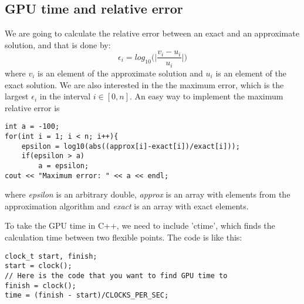 \documentclass{scrartcl}
\begin{document}
\subsection{GPU time and relative error}
We are going to calculate the relative error between an exact and an approximate solution, and that is done by:
$$\epsilon_i=log_{10}\bigg(\bigg|\frac{v_i-u_i}{u_i}\bigg|\bigg)$$
where $v_i$ is an element of the approximate solution and $u_i$ is an element of the exact solution. We are also interested in the the maximum error, which is the largest $\epsilon_i$ in the interval $i\in[0,n]$. An easy way to implement the maximum relative error is
\begin{lstlisting}
int a = -100;
for(int i = 1; i < n; i++){
    epsilon = log10(abs((approx[i]-exact[i])/exact[i]));
    if(epsilon > a)
        a = epsilon;
cout << "Maximum error: " << a << endl;
\end{lstlisting}
where \textit{epsilon} is an arbitrary double, \textit{approx} is an array with elements from the approximation algorithm and \textit{exact} is an array with exact elements.\par\vspace{3mm}

To take the GPU time in C++, we need to include 'ctime', which finds the calculation time between two flexible points. The code is like this:
\begin{lstlisting}
clock_t start, finish;
start = clock();
// Here is the code that you want to find GPU time to
finish = clock();
time = (finish - start)/CLOCKS_PER_SEC;
\end{lstlisting}\par\vspace{3mm}
\end{document}
